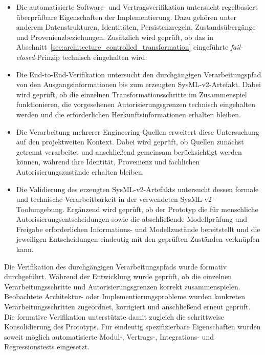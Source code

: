 \begin{itemize}
    \item Die automatisierte Software- und Vertragsverifikation untersucht
          regelbasiert überprüfbare Eigenschaften der Implementierung. Dazu
          gehören unter anderem Datenstrukturen, Identitäten,
          Persistenzregeln, Zustandsübergänge und Provenienzbeziehungen.
          Zusätzlich wird geprüft, ob das in
          Abschnitt~\ref{sec:architecture_controlled_transformation}
          eingeführte \emph{fail-closed}-Prinzip technisch eingehalten wird.

    \item Die End-to-End-Verifikation untersucht den durchgängigen
          Verarbeitungspfad von den Ausgangsinformationen bis zum erzeugten
          SysML-v2-Artefakt. Dabei wird geprüft, ob die einzelnen
          Transformationsschritte im Zusammenspiel funktionieren, die
          vorgesehenen Autorisierungsgrenzen technisch eingehalten werden
          und die erforderlichen Herkunftsinformationen erhalten bleiben.

    \item Die Verarbeitung mehrerer Engineering-Quellen erweitert diese
          Untersuchung auf den projektweiten Kontext. Dabei wird geprüft,
          ob Quellen zunächst getrennt verarbeitet und anschließend
          gemeinsam berücksichtigt werden können, während ihre Identität,
          Provenienz und fachlichen Autorisierungszustände erhalten bleiben.

    \item Die Validierung des erzeugten SysML-v2-Artefakts untersucht
          dessen formale und technische Verarbeitbarkeit in der verwendeten
          SysML-v2-Toolumgebung. Ergänzend wird geprüft, ob der Prototyp die
          für menschliche Autorisierungsentscheidungen sowie die
          abschließende Modellprüfung und Freigabe erforderlichen
          Informations- und Modellzustände bereitstellt und die jeweiligen
          Entscheidungen eindeutig mit den geprüften Zuständen verknüpfen
          kann.
\end{itemize}

Die Verifikation des durchgängigen Verarbeitungspfads wurde formativ
durchgeführt. Während der Entwicklung wurde geprüft, ob die einzelnen
Verarbeitungsschritte und Autorisierungsgrenzen korrekt zusammenspielen.
Beobachtete Architektur- oder Implementierungsprobleme wurden konkreten
Verarbeitungsschritten zugeordnet, korrigiert und anschließend erneut
geprüft. Die formative Verifikation unterstützte damit zugleich die
schrittweise Konsolidierung des Prototyps. Für eindeutig spezifizierbare
Eigenschaften wurden soweit möglich automatisierte Modul-, Vertrags-,
Integrations- und Regressionstests eingesetzt.

